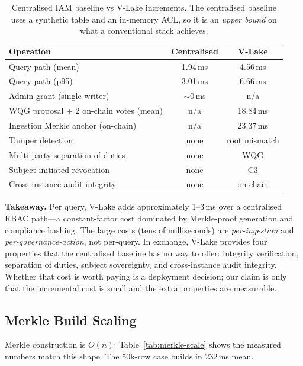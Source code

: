 \documentclass[10pt,twocolumn]{article}
\begin{document}
\begin{table}[t]
\centering
\small
\caption{Centralised IAM baseline vs V-Lake increments. The
centralised baseline uses a synthetic table and an in-memory ACL,
so it is an \emph{upper bound} on what a conventional stack
achieves.}
\label{tab:centralized}
\begin{tabular}{@{}lcc@{}}
\toprule
\textbf{Operation} & \textbf{Centralised} & \textbf{V-Lake} \\
\midrule
Query path (mean)                      & 1.94\,ms  & 4.56\,ms      \\
Query path (p95)                       & 3.01\,ms  & 6.66\,ms      \\
Admin grant (single writer)            & $\sim0$\,ms & n/a         \\
WQG proposal + 2 on-chain votes (mean) & n/a       & 18.84\,ms     \\
Ingestion Merkle anchor (on-chain)     & n/a       & 23.37\,ms     \\
Tamper detection                       & none      & root mismatch \\
Multi-party separation of duties       & none      & WQG           \\
Subject-initiated revocation           & none      & C3            \\
Cross-instance audit integrity         & none      & on-chain      \\
\bottomrule
\end{tabular}
\end{table}

\noindent
\textbf{Takeaway.} Per query, V-Lake adds approximately 1--3\,ms
over a centralised RBAC path---a constant-factor cost dominated by
Merkle-proof generation and compliance hashing. The large costs
(tens of milliseconds) are \emph{per-ingestion} and
\emph{per-governance-action}, not per-query. In exchange, V-Lake
provides four properties that the centralised baseline has no way
to offer: integrity verification, separation of duties, subject
sovereignty, and cross-instance audit integrity. Whether that cost
is worth paying is a deployment decision; our claim is only that
the incremental cost is small and the extra properties are
measurable.

\subsection{Merkle Build Scaling}

Merkle construction is $O(n)$; Table~\ref{tab:merkle-scale} shows
the measured numbers match this shape. The 50k-row case builds in
232\,ms mean.
\end{document}
